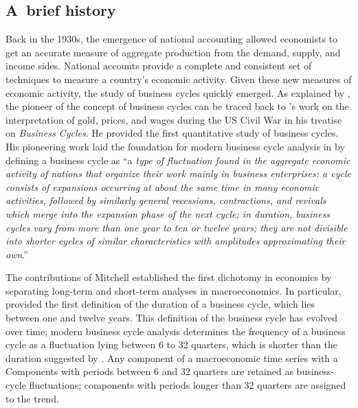 \documentclass[a4paper,12pt]{article}%
\begin{document}
\subsection{A\ brief history}
Back in the 1930s, the emergence of national accounting allowed economists to
get an accurate measure of aggregate production from the demand, supply, and
income sides. National accounts provide a complete and consistent set of
techniques to measure a country's economic activity. Given these new measures
of economic activity, the study of business cycles quickly emerged. As
explained by \cite{schumpeter1930mitchell}, the pioneer of the concept of
business cycles can be traced back to \cite{mitchell1913business}'s work on the
interpretation of gold, prices, and wages during the US Civil War in his
treatise on \textit{Business Cycles}. He provided the first quantitative
study of business cycles. His pioneering work laid the foundation for modern
business cycle analysis in \cite{burns1946measuring} by defining a business
cycle as \textquotedblleft a \textit{type of fluctuation found in the
aggregate economic activity of nations that organize their work mainly in
business enterprises: a cycle consists of expansions occurring at about the
same time in many economic activities, followed by similarly general
recessions, contractions, and revivals which merge into the expansion phase of
the next cycle; in duration, business cycles vary from more than one year to
ten or twelve years; they are not divisible into shorter cycles of similar
characteristics with amplitudes approximating their own}.\textquotedblright

The contributions of Mitchell established the first dichotomy in economics by
separating long-term and short-term analyses in macroeconomics. In particular,
\cite{burns1946measuring} provided the first definition of the duration of a
business cycle, which lies between one and twelve years. This definition of
the business cycle has evolved over time; modern business cycle analysis
determines the frequency of a business cycle as a fluctuation lying between 6
to 32 quarters, which is shorter than the duration suggested by
\cite{burns1946measuring}. Any component of a macroeconomic time series with a
Components with periods between 6 and 32 quarters are retained as business-cycle fluctuations;
components with periods longer than 32 quarters are assigned to the trend.
\end{document}
